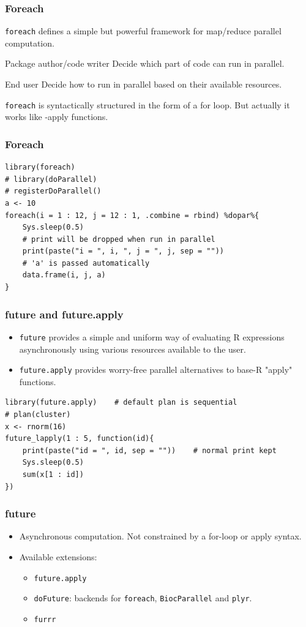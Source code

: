 \documentclass[aspectratio=169,xcolor={dvipsnames,table}]{beamer}
\begin{document}
\begin{frame}[fragile]
  \frametitle{Foreach}
  \texttt{foreach} defines a simple but powerful framework for map/reduce parallel computation.
  \begin{block}{Package author/code writer}
    Decide {\color{Brown}which part of code} can run in parallel.
  \end{block}
  \begin{block}{End user}
    Decide {\color{Brown}how} to run in parallel based on their available resources.
  \end{block}
  \texttt{foreach} is syntactically structured in the form of a for loop. But actually it works like {\color{red}-apply} functions.
\end{frame}

\begin{frame}[fragile]
  \frametitle{Foreach}
\begin{verbatim}
library(foreach)
# library(doParallel)
# registerDoParallel()
a <- 10
foreach(i = 1 : 12, j = 12 : 1, .combine = rbind) %dopar%{
    Sys.sleep(0.5)
    # print will be dropped when run in parallel
    print(paste("i = ", i, ", j = ", j, sep = ""))
    # 'a' is passed automatically
    data.frame(i, j, a)
}
\end{verbatim}
\end{frame}

\begin{frame}[fragile]
  \frametitle{future and future.apply}
  \begin{itemize}
  \item \texttt{future} provides a simple and uniform way of evaluating R expressions asynchronously using various resources available to the user.
  \item \texttt{future.apply} provides worry-free parallel alternatives to base-R "apply" functions.
  \end{itemize}
\begin{verbatim}
library(future.apply)    # default plan is sequential
# plan(cluster)
x <- rnorm(16)
future_lapply(1 : 5, function(id){
    print(paste("id = ", id, sep = ""))    # normal print kept
    Sys.sleep(0.5)
    sum(x[1 : id])
})
\end{verbatim}
\end{frame}

\begin{frame}[fragile]
  \frametitle{future}
  \begin{itemize}
  \item Asynchronous computation. Not constrained by a for-loop or apply syntax.
  \item Available extensions:
    \begin{itemize}
    \item \texttt{future.apply}
    \item \texttt{doFuture}: backends for \texttt{foreach}, \texttt{BiocParallel} and \texttt{plyr}.
    \item \texttt{furrr}
    \end{itemize}
  \end{itemize}
\end{frame}
\end{document}

